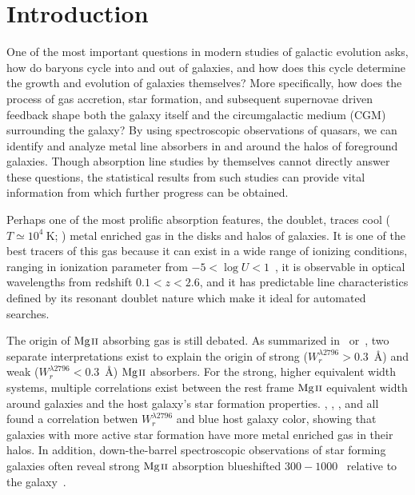 \documentclass[iop,apj,numberedappendix,appendixfloats,twocolappendix]{emulateapj}
\begin{document}

\section{Introduction}
\label{sec:intro}

One of the most important questions in modern studies of galactic evolution asks, how do baryons cycle into and out of galaxies, and how does this cycle determine the growth and evolution of galaxies themselves? More specifically, how does the process of gas accretion, star formation, and subsequent supernovae driven feedback shape both the galaxy itself and the circumgalactic medium (CGM) surrounding the galaxy? By using spectroscopic observations of quasars, we can identify and analyze metal line absorbers in and around the halos of foreground galaxies. Though absorption line studies by themselves cannot directly answer these questions, the statistical results from such studies can provide vital information from which further progress can be obtained.

Perhaps one of the most prolific absorption features, the {\MgIIdblt} doublet, traces cool ($T \simeq 10^4~\mathrm{K}$; \cite{Churchill2003}) metal enriched gas in the disks and halos of galaxies. It is one of the best tracers of this gas because it can exist in a wide range of ionizing conditions, ranging in ionization parameter from $-5 < \log U < 1$~\citep{Churchill1999}, it is observable in optical wavelengths from redshift $0.1 < z < 2.6$, and it has predictable line characteristics defined by its resonant doublet nature which make it ideal for automated searches. 

The origin of ${\hbox{{\rm Mg}\kern 0.1em{\sc ii}}}$ absorbing gas is still debated. As summarized in~\cite{Kacprzak2011} or~\cite{Matejek2013}, two separate interpretations exist to explain the origin of strong ($W_r^{\lambda2796} > 0.3$~{\AA}) and weak ($W_r^{\lambda2796} < 0.3$~{\AA}) ${\hbox{{\rm Mg}\kern 0.1em{\sc ii}}}$ absorbers. For the strong, higher equivalent width systems, multiple correlations exist between the rest frame ${\hbox{{\rm Mg}\kern 0.1em{\sc ii}}}$ equivalent width around galaxies and the host galaxy's star formation properties. \cite{Zibetti2007}, \cite{Lundgren2009}, \cite{Noterdaeme2010}, and \cite{Nestor2011} all found a correlation betwen $W_r^{\lambda2796}$ and blue host galaxy color, showing that galaxies with more active star formation have more metal enriched gas in their halos. In addition, down-the-barrel spectroscopic observations of star forming galaxies often reveal strong ${\hbox{{\rm Mg}\kern 0.1em{\sc ii}}}$ absorption blueshifted $300 - 1000$~{\kms} relative to the galaxy~\citep{Tremonti2007,Weiner2009,Martin2009,Rubin2010}. 
\end{document}
